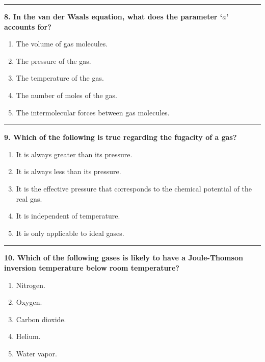 \documentclass[
  9pt,
]{extbook}
\providecommand{\tightlist}{%
  \setlength{\itemsep}{0pt}\setlength{\parskip}{0pt}}
\theoremstyle{definition}
\theoremstyle{definition}
\theoremstyle{definition}
\theoremstyle{definition}
\theoremstyle{remark}
\begin{document}
\begin{center}\rule{0.5\linewidth}{0.5pt}\end{center}

\textbf{8. In the van der Waals equation, what does the parameter `\(a\)' accounts for?}

\begin{enumerate}
\def\labelenumi{\alph{enumi}.}
\tightlist
\item
  The volume of gas molecules.
\item
  The pressure of the gas.
\item
  The temperature of the gas.
\item
  The number of moles of the gas.
\item
  The intermolecular forces between gas molecules.
\end{enumerate}

\begin{center}\rule{0.5\linewidth}{0.5pt}\end{center}

\textbf{9. Which of the following is true regarding the fugacity of a gas?}

\begin{enumerate}
\def\labelenumi{\alph{enumi}.}
\tightlist
\item
  It is always greater than its pressure.
\item
  It is always less than its pressure.
\item
  It is the effective pressure that corresponds to the chemical potential of the real gas.
\item
  It is independent of temperature.
\item
  It is only applicable to ideal gases.
\end{enumerate}

\begin{center}\rule{0.5\linewidth}{0.5pt}\end{center}

\textbf{10. Which of the following gases is likely to have a Joule-Thomson inversion temperature below room temperature?}

\begin{enumerate}
\def\labelenumi{\alph{enumi}.}
\tightlist
\item
  Nitrogen.
\item
  Oxygen.
\item
  Carbon dioxide.
\item
  Helium.
\item
  Water vapor.
\end{enumerate}
\end{document}
